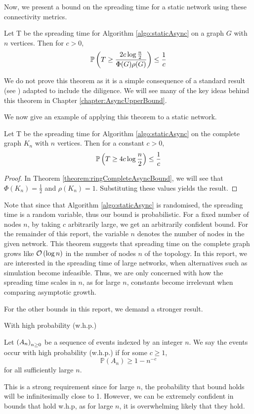 Now, we present a bound on the spreading time for a static network using these connectivity metrics.

\begin{theorem}\label{theorem:staticBound}
	Let T be the spreading time for Algorithm \ref{algo:staticAsync} on a graph $G$ with $n$ vertices. Then for $c > 0$,
	$$
		\mathbb{P}\left( T \geq \frac{2c \log \frac{n}{2}}{\Phi(G)\rho(G)}\right) \leq \frac{1}{c}
	$$
\end{theorem}

We do not prove this theorem as it is a simple consequence of a standard result (see \cite{complexNetworksRumourSpreading}) adapted to include the diligence. We will see many of the key ideas behind this theorem in Chapter \ref{chapter:AsyncUpperBound}.

We now give an example of applying this theorem to a static network.

\begin{theorem}
	Let T be the spreading time for Algorithm \ref{algo:staticAsync} on the complete graph $K_n$ with $n$ vertices. Then for a constant $c > 0$,
	$$
		\mathbb{P}\left( T \geq 4c \log \frac{n}{2} \right) \leq \frac{1}{c} 
	$$
\end{theorem}

\begin{proof}
	In Theorem \ref{theorem:ringCompleteAsyncBound}, we will see that $\Phi(K_n) = \frac{1}{2}$ and $\rho(K_n) = 1$. Substituting these values yields the result.
\end{proof}

Note that since that Algorithm \ref{algo:staticAsync} is randomised, the spreading time is a random variable, thus our bound is probabilistic. 
For a fixed number of nodes $n$, by taking $c$ arbitrarily large, we get an arbitrarily confident bound.
For the remainder of this report, the variable $n$ denotes the number of nodes in the given network.
This theorem suggests that spreading time on the complete graph grows like 
$
	\mathcal{O} \left( \log n \right)
$
in the number of nodes $n$ of the topology. In this report, we are interested in the spreading time of large networks, when alternatives such as simulation become infeasible. Thus, we are only concerned with how the spreading time scales in $n$, as for large $n$, constants become irrelevant when comparing asymptotic growth.

For the other bounds in this report, we demand a stronger result.

\begin{definition}
	With high probability (w.h.p.)

	\noindent
	Let $\left( A_n \right)_{n \geq 0}$ be a sequence of events indexed by an integer $n$. We say the events occur with high probability (w.h.p.) if for some $c \geq 1$, 
	$$
		\mathbb{P}(A_n) \geq 1 - n^{-c}
	$$ for all sufficiently large $n$.
\end{definition}

This is a strong requirement since for large $n$, the probability that bound holds will be infinitesimally close to 1. However, we can be extremely confident in bounds that hold w.h.p, as for large $n$, it is overwhelming likely that they hold.
